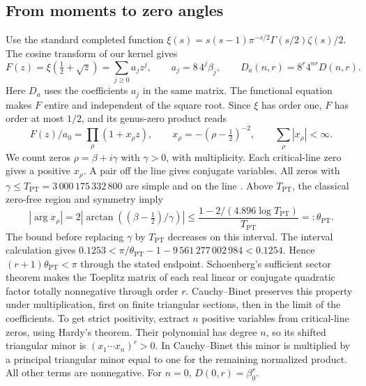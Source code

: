 \documentclass[11pt,a4paper,reqno]{amsart}
\numberwithin{equation}{section}
\begin{document}
\subsection{From moments to zero angles}\label{sec:sector}
Use the standard completed function \(\xi(s)=s(s-1)\pi^{-s/2}\Gamma(s/2)\zeta(s)/2\). The cosine transform of our kernel \cite{nuttall,rt} gives
\[
 F(z)=\xi(\tfrac12+\sqrt z)=\sum_{j\ge0}a_jz^j,\qquad a_j=8\,4^j\beta_j,\qquad
 D_a(n,r)=8^r4^{nr}D(n,r).
\]
Here \(D_a\) uses the coefficients \(a_j\) in the same matrix. The functional equation makes \(F\) entire and independent of the square root. Since \(\xi\) has order one, \(F\) has order at most \(1/2\), and its genus-zero product reads
\[
 F(z)/a_0=\prod_{\rho}(1+x_\rho z),\qquad
 x_\rho=-(\rho-\tfrac12)^{-2},\qquad \sum_{\rho}|x_\rho|<\infty.
\]
We count zeros \(\rho=\beta+i\gamma\) with \(\gamma>0\), with multiplicity. Each critical-line zero gives a positive \(x_\rho\). A pair off the line gives conjugate variables. All zeros with \(\gamma\le T_{\mathrm{PT}}=3\,000\,175\,332\,800\) are simple and on the line \cite[Theorem~1 and \S2]{pt}. Above \(T_{\mathrm{PT}}\), the classical zero-free region \cite{bty} and symmetry imply
\[
 |\arg x_\rho|=2|\arctan((\beta-\tfrac12)/\gamma)|
 \le\frac{1-2/(4.896\log T_{\mathrm{PT}})}{T_{\mathrm{PT}}}=:\theta_{\mathrm{PT}} .
\]
The bound before replacing \(\gamma\) by \(T_{\mathrm{PT}}\) decreases on this interval. The interval calculation gives \(0.1253<\pi/\theta_{\mathrm{PT}}-1-9\,561\,277\,002\,984<0.1254\). Hence \((r+1)\theta_{\mathrm{PT}}<\pi\) through the stated endpoint. Schoenberg's sufficient sector theorem \cite[Theorem~30.27]{khare} makes the Toeplitz matrix of each real linear or conjugate quadratic factor totally nonnegative through order \(r\). Cauchy--Binet preserves this property under multiplication, first on finite triangular sections, then in the limit of the coefficients. To get strict positivity, extract \(n\) positive variables from critical-line zeros, using Hardy's theorem. Their polynomial has degree \(n\), so its shifted triangular minor is \((x_1\cdots x_n)^r>0\). In Cauchy--Binet this minor is multiplied by a principal triangular minor equal to one for the remaining normalized product. All other terms are nonnegative. For \(n=0\), \(D(0,r)=\beta_0^r\).
\end{document}
